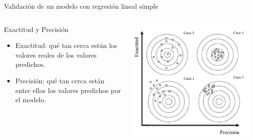 \documentclass[serif, aspectratio=169]{beamer}
\begin{document}
\begin{frame}{Validación de un modelo con regresión lineal simple}

\begin{columns}
	\begin{column}{0.5\textwidth}
		\begin{exampleblock}{Exactitud y Precisión}
		\end{exampleblock}	
		\vspace{0.5cm}
		\begin{itemize}
			\item Exactitud: qué tan cerca están los valores reales de los valores predichos.
			\vspace{.3cm}
			\item Precisión: qué tan cerca están entre ellos los valores predichos por el modelo.
		\end{itemize}
	\end{column}
	
	\begin{column}{0.5\textwidth}
		\centering
		\includegraphics[width=\linewidth]{recurso/tadeshi_casos.png}
	\end{column}
\end{columns}
\end{frame}
\end{document}
